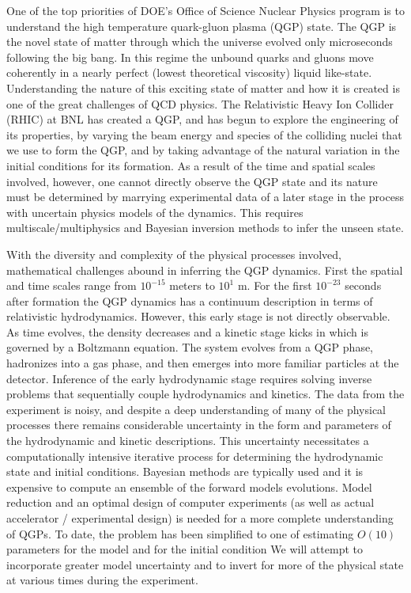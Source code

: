 \documentclass[11pt]{article}
\begin{document}
One of the top priorities of DOE's Office of Science Nuclear Physics
program is to understand the high temperature quark-gluon plasma (QGP)
state.  The QGP is the novel state of matter through which the
universe evolved only microseconds following the big bang.  In this
regime the unbound quarks and gluons move coherently in a nearly
perfect (lowest theoretical viscosity) liquid like-state.
Understanding the nature of this exciting state of matter and how it
is created is one of the great challenges of QCD physics.  The
Relativistic Heavy Ion Collider (RHIC) at BNL has created a QGP, and
has begun to explore the engineering of its properties, by varying the
beam energy and species of the colliding nuclei that we use to form
the QGP, and by taking advantage of the natural variation in the
initial conditions for its formation.  As a result of the time and
spatial scales involved, however, one cannot directly observe the QGP
state and its nature must be determined by marrying experimental data
of a later stage in the process with uncertain physics models of the
dynamics.  This requires multiscale/multiphysics and Bayesian
inversion methods to infer the unseen state.

With the diversity and complexity of the physical processes involved,
mathematical challenges abound in inferring the QGP dynamics.  First
the spatial and time scales range from $10^{-15}$ meters to $10^{1}$
m.  For the first $10^{-23}$ seconds after formation the QGP dynamics
has a continuum description in terms of relativistic hydrodynamics.
However, this early stage is not directly observable.  As time
evolves, the density decreases and a kinetic stage kicks in which is
governed by a Boltzmann equation.  The system evolves from a QGP
phase, hadronizes into a gas phase, and then emerges into more
familiar particles at the detector.  Inference of the early
hydrodynamic stage requires solving inverse problems that sequentially
couple hydrodynamics and kinetics.  The data from the experiment is
noisy, and despite a deep understanding of many of the physical
processes there remains considerable uncertainty in the form and
parameters of the hydrodynamic and kinetic descriptions.  This
uncertainty necessitates a computationally intensive iterative process
for determining the hydrodynamic state and initial conditions.
Bayesian methods are typically used and it is expensive to compute an
ensemble of the forward models evolutions.  Model reduction and an
optimal design of computer experiments (as well as actual accelerator
/ experimental design) is needed for a more complete understanding of
QGPs. To date, the problem has been simplified to one of estimating
$O(10)$ parameters for the model and for the initial condition We will
attempt to incorporate greater model uncertainty and to invert for
more of the physical state at various times during the experiment.
\end{document}

